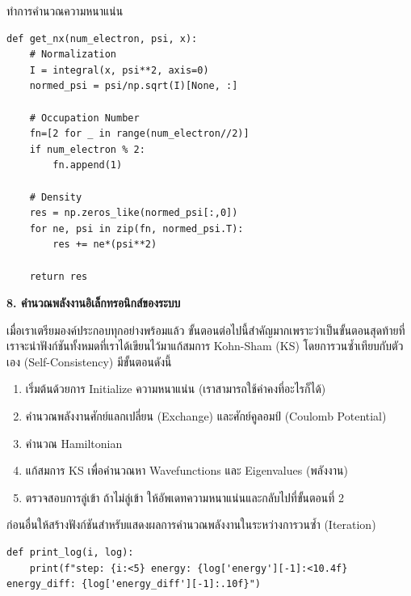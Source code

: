 \vspace{1em}
\noindent ทำการคำนวณความหนาแน่น

\begin{lstlisting}[style=MyPython]
def get_nx(num_electron, psi, x):
    # Normalization
    I = integral(x, psi**2, axis=0)
    normed_psi = psi/np.sqrt(I)[None, :]
    
    # Occupation Number
    fn=[2 for _ in range(num_electron//2)]
    if num_electron % 2:
        fn.append(1)

    # Density
    res = np.zeros_like(normed_psi[:,0])
    for ne, psi in zip(fn, normed_psi.T):
        res += ne*(psi**2)

    return res
\end{lstlisting}

\vspace{1em}
\noindent \textbf{8. คำนวณพลังงานอิเล็กทรอนิกส์ของระบบ}

เมื่อเราเตรียมองค์ประกอบทุกอย่างพร้อมแล้ว ขั้นตอนต่อไปนี้สำคัญมากเพราะว่าเป็นขั้นตอนสุดท้ายที่เราจะนำฟังก์ชันทั้งหมดที่เราได้เขียนไว้มาแก้สมการ 
Kohn-Sham (KS) โดยการวนซ้ำเทียบกับตัวเอง (Self-Consistency) มีขั้นตอนดังนี้

\begin{enumerate}[topsep=0pt,noitemsep]
    \item เริ่มต้นด้วยการ Initialize ความหนาแน่น (เราสามารถใช้ค่าคงที่อะไรก็ได้)
    
    \item คำนวณพลังงานศักย์แลกเปลี่ยน (Exchange) และศักย์คูลอมป์ (Coulomb Potential)
    
    \item คำนวณ Hamiltonian
    
    \item แก้สมการ KS เพื่อคำนวณหา Wavefunctions และ Eigenvalues (พลังงาน)
    
    \item ตรวจสอบการลู่เข้า ถ้าไม่ลู่เข้า ให้อัพเดทความหนาแน่นและกลับไปที่ขั้นตอนที่ 2
\end{enumerate}

ก่อนอื่นให้สร้างฟังก์ชันสำหรับแสดงผลการคำนวณพลังงานในระหว่างการวนซ้ำ (Iteration)

\begin{lstlisting}[style=MyPython]
def print_log(i, log):
    print(f"step: {i:<5} energy: {log['energy'][-1]:<10.4f} energy_diff: {log['energy_diff'][-1]:.10f}")
\end{lstlisting}

\vspace{1em}


